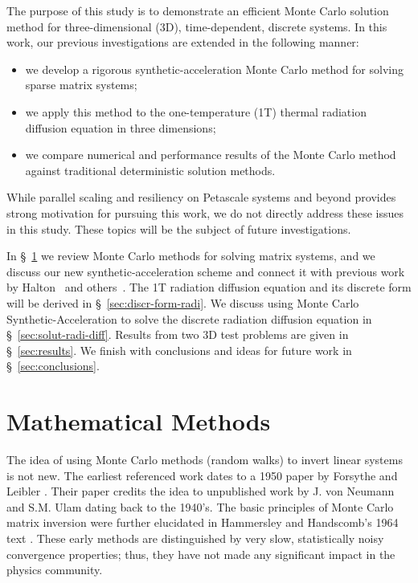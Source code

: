 \documentclass[preprint,12pt]{elsarticle}
\begin{document}
The purpose of this study is to demonstrate an efficient Monte Carlo solution
method for three-dimensional (3D), time-dependent, discrete systems. In this
work, our previous investigations are extended in the following manner:
\begin{itemize}
\item we develop a rigorous synthetic-acceleration Monte Carlo method
  for solving sparse matrix systems;
\item we apply this method to the one-temperature (1T) thermal radiation
  diffusion equation in three dimensions;
\item we compare numerical and performance results of the Monte Carlo
  method against traditional deterministic solution methods.
\end{itemize}
While parallel scaling and resiliency on Petascale systems and beyond provides
strong motivation for pursuing this work, we do not directly address these
issues in this study.  These topics will be the subject of future
investigations.

In \S~\ref{sec:monte-carlo-matrix} we review Monte Carlo methods for solving
matrix systems, and we discuss our new synthetic-acceleration scheme and
connect it with previous work by Halton~\cite{halton_1994} and
others~\cite{evans_2003}.  The 1T radiation diffusion equation and its
discrete form will be derived in \S~\ref{sec:discr-form-radi}.  We discuss
using Monte Carlo Synthetic-Acceleration to solve the discrete radiation
diffusion equation in \S~\ref{sec:solut-radi-diff}.  Results from two 3D test
problems are given in \S~\ref{sec:results}.  We finish with conclusions and
ideas for future work in \S~\ref{sec:conclusions}.

\section{Mathematical Methods}
\label{sec:monte-carlo-matrix}

The idea of using Monte Carlo methods (random walks) to invert linear systems
is not new.  The earliest referenced work dates to a 1950 paper by Forsythe
and Leibler \cite{forsythe}.  Their paper credits the idea to unpublished work
by J. von Neumann and S.M. Ulam dating back to the 1940's.  The basic
principles of Monte Carlo matrix inversion were further elucidated in
Hammersley and Handscomb's 1964 text \cite{hammersley_1964}.  These early
methods are distinguished by very slow, statistically noisy convergence
properties; thus, they have not made any significant impact in the physics
community.
\end{document}
